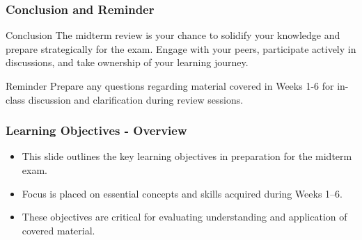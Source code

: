 \documentclass[aspectratio=169]{beamer}
\begin{document}
\begin{frame}[fragile]
    \frametitle{Conclusion and Reminder}
    \begin{block}{Conclusion}
        The midterm review is your chance to solidify your knowledge and prepare strategically for the exam. Engage with your peers, participate actively in discussions, and take ownership of your learning journey.
    \end{block}
    
    \begin{block}{Reminder}
        Prepare any questions regarding material covered in Weeks 1-6 for in-class discussion and clarification during review sessions. 
    \end{block}
\end{frame}

\begin{frame}[fragile]
    \frametitle{Learning Objectives - Overview}
    \begin{itemize}
        \item This slide outlines the key learning objectives in preparation for the midterm exam.
        \item Focus is placed on essential concepts and skills acquired during Weeks 1–6.
        \item These objectives are critical for evaluating understanding and application of covered material.
    \end{itemize}
\end{frame}
\end{document}

